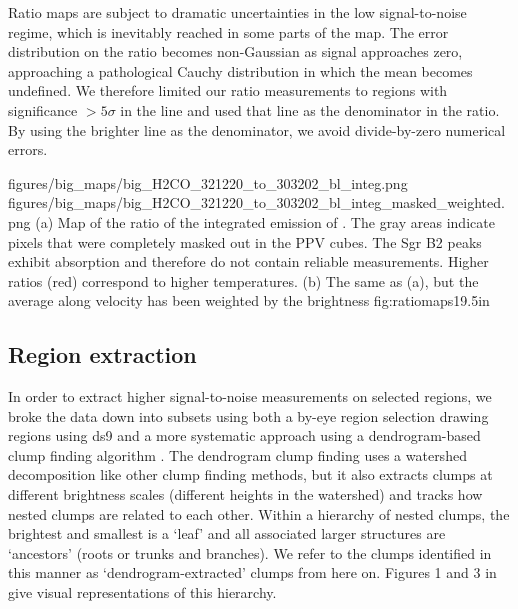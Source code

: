 Ratio maps are subject to dramatic uncertainties in the low signal-to-noise
regime, which is inevitably reached in some parts of the map.  The error
distribution on the ratio becomes non-Gaussian as signal approaches zero,
approaching a pathological Cauchy distribution in which the mean becomes
undefined.
We therefore limited our ratio measurements to regions with significance
$>5\sigma$ in the \threeohthree line and used that line as the denominator
in the ratio.  By using the brighter line as the denominator, we avoid
divide-by-zero numerical errors.


\RotFigureTwoAA
{figures/big_maps/big_H2CO_321220_to_303202_bl_integ.png}
{figures/big_maps/big_H2CO_321220_to_303202_bl_integ_masked_weighted.png}
{(a) Map of the ratio of the integrated emission of
\Rone.  The gray areas indicate pixels that were completely masked out in the
PPV cubes.  The Sgr B2 peaks exhibit \formaldehyde absorption and therefore do
not contain reliable measurements.  Higher ratios
(red) correspond
to higher temperatures.
\newline
(b) The same as (a), but the average along velocity has been
weighted by the \threeohthree brightness
\newline
}
{fig:ratiomaps}{1}{9.5in}



\subsection{Region extraction}
\label{sec:region}
In order to extract higher signal-to-noise measurements on selected regions, we
broke the data down into subsets using both a by-eye region selection drawing
regions using ds9 and a more systematic approach using a dendrogram-based clump
finding algorithm \citep[][\url{http://dendrograms.org/}]{Rosolowsky2008c}.
The dendrogram clump finding uses a watershed decomposition like other clump
finding methods, but it also extracts clumps at different brightness scales
(different heights in the watershed) and tracks how nested clumps are related
to each other.  Within a hierarchy of nested clumps, the brightest and smallest
is a `leaf' and all associated larger structures are `ancestors' (roots or
trunks and branches).  We refer to the clumps identified in this manner as
`dendrogram-extracted' clumps from here on.
Figures 1 and 3 in \citet{Rosolowsky2008c} give visual representations of this
hierarchy.

